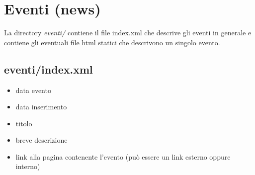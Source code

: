 \documentclass[a4paper,10pt]{article}
\begin{document}
\section{Eventi (news)}
La directory \textit{eventi/} contiene il file index.xml che descrive gli eventi in generale e contiene gli eventuali file html statici che descrivono un singolo evento.
 
\subsection{eventi/index.xml}
\begin{itemize}
 \item data evento
 \item data inserimento
 \item titolo
 \item breve descrizione
 \item link alla pagina contenente l'evento (pu\`o essere un link esterno oppure interno)
\end{itemize}
\end{document}
